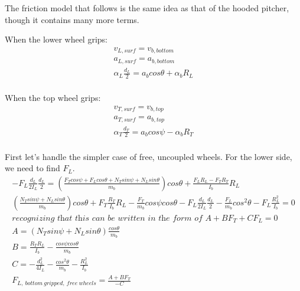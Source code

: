 \documentclass[10pt,letterpaper]{article}
\begin{document}

The friction model that follows is the same idea as that of the hooded pitcher, though it contains many more terms.

When the lower wheel grips:
\begin{align}
	v_{L,surf} = v_{b,bottom} \nonumber \\
	a_{L,surf} = a_{b,bottom} \nonumber \\
	\alpha_{L} \frac{d_L}{2} = a_{b} cos \theta + \alpha_{b} R_L \\
\end{align}

When the top wheel grips:
\begin{align}
	v_{T,surf} = v_{b,top} \nonumber \\
	a_{T,surf} = a_{b,top} \nonumber \\
	\alpha_{T} \frac{d_T}{2} = a_{b} cos \psi - \alpha_{b} R_T \\
\end{align}

First let's handle the simpler case of free, uncoupled wheels. For the lower side, we need to find $F_L$.
\begin{align}
	- F_L \frac{d_L}{2 I_L} \frac{d_L}{2} = (\frac{F_T cos \psi + F_L cos \theta + N_T sin \psi + N_L sin \theta}{m_b}) cos \theta + \frac{F_L R_L - F_T R_T}{I_b} R_L \\
	(\frac{N_T sin \psi + N_L sin \theta}{m_b}) cos \theta + F_T \frac{R_T}{I_b} R_L - \frac{F_T}{m_b} cos \psi cos \theta - F_L \frac{d_L}{2 I_L} \frac{d_L}{2} - \frac{F_L}{m_b} cos^2 \theta - F_L \frac{R_L^2}{I_b} = 0\\
	\textit{recognizing that this can be written in the form of } A + B F_T + C F_L = 0 \\
	A = (N_T sin \psi + N_L sin \theta) \frac{cos \theta}{m_b} \\
	B = \frac{R_T R_L}{I_b} - \frac{cos \psi cos \theta}{m_b} \\
	C = - \frac{d_L^2}{4 I_L} - \frac{cos^2 \theta}{m_b} - \frac{R_L^2}{I_b} \\
	F_{L,\ bottom\ gripped,\ free\ wheels} = \frac{A + B F_T}{- C}
\end{align}
\end{document}
